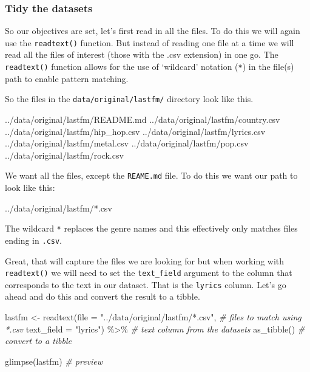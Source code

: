 \documentclass[
]{article}
\newenvironment{Shaded}{\begin{snugshade}}{\end{snugshade}}
\newcommand{\AttributeTok}[1]{\textcolor[rgb]{0.77,0.63,0.00}{#1}}
\newcommand{\CommentTok}[1]{\textcolor[rgb]{0.56,0.35,0.01}{\textit{#1}}}
\newcommand{\ExtensionTok}[1]{#1}
\newcommand{\FunctionTok}[1]{\textcolor[rgb]{0.00,0.00,0.00}{#1}}
\newcommand{\NormalTok}[1]{#1}
\newcommand{\OtherTok}[1]{\textcolor[rgb]{0.56,0.35,0.01}{#1}}
\newcommand{\SpecialCharTok}[1]{\textcolor[rgb]{0.00,0.00,0.00}{#1}}
\newcommand{\StringTok}[1]{\textcolor[rgb]{0.31,0.60,0.02}{#1}}
\begin{document}
\hypertarget{tidy-the-datasets}{%
\subsubsection{Tidy the datasets}\label{tidy-the-datasets}}

So our objectives are set, let's first read in all the files. To do this we will again use the \texttt{readtext()} function. But instead of reading one file at a time we will read all the files of interest (those with the .csv extension) in one go. The \texttt{readtext()} function allows for the use of `wildcard' notation (\texttt{*}) in the file(s) path to enable pattern matching.

So the files in the \texttt{data/original/lastfm/} directory look like this.

\begin{Shaded}
\begin{Highlighting}[]
\ExtensionTok{../data/original/lastfm/README.md}
\ExtensionTok{../data/original/lastfm/country.csv}
\ExtensionTok{../data/original/lastfm/hip\_hop.csv}
\ExtensionTok{../data/original/lastfm/lyrics.csv}
\ExtensionTok{../data/original/lastfm/metal.csv}
\ExtensionTok{../data/original/lastfm/pop.csv}
\ExtensionTok{../data/original/lastfm/rock.csv}
\end{Highlighting}
\end{Shaded}

We want all the files, except the \texttt{REAME.md} file. To do this we want our path to look like this:

\begin{Shaded}
\begin{Highlighting}[]
\ExtensionTok{../data/original/lastfm/*.csv}
\end{Highlighting}
\end{Shaded}

The wildcard \texttt{*} replaces the genre names and this effectively only matches files ending in \texttt{.csv}.

Great, that will capture the files we are looking for but when working with \texttt{readtext()} we will need to set the \texttt{text\_field} argument to the column that corresponds to the text in our dataset. That is the \texttt{lyrics} column. Let's go ahead and do this and convert the result to a tibble.

\begin{Shaded}
\begin{Highlighting}[]
\NormalTok{lastfm }\OtherTok{\textless{}{-}} 
  \FunctionTok{readtext}\NormalTok{(}\AttributeTok{file =} \StringTok{"../data/original/lastfm/*.csv"}\NormalTok{, }\CommentTok{\# files to match using *.csv}
           \AttributeTok{text\_field =} \StringTok{"lyrics"}\NormalTok{) }\SpecialCharTok{\%\textgreater{}\%} \CommentTok{\# text column from the datasets}
  \FunctionTok{as\_tibble}\NormalTok{() }\CommentTok{\# convert to a tibble}

\FunctionTok{glimpse}\NormalTok{(lastfm) }\CommentTok{\# preview}
\end{Highlighting}
\end{Shaded}
\end{document}
